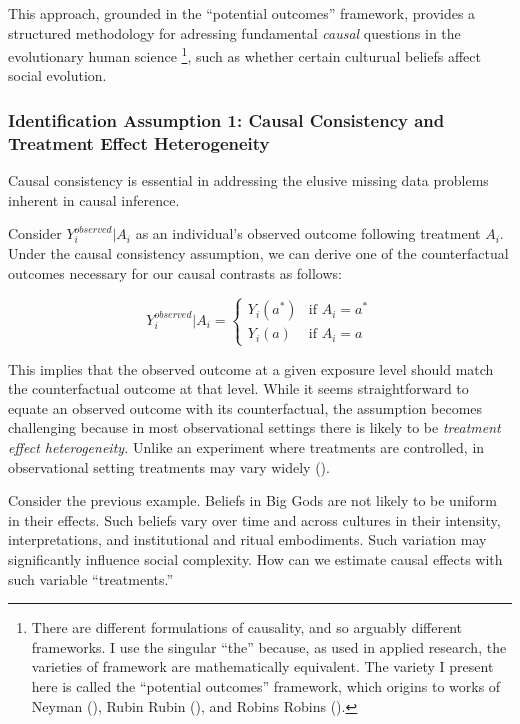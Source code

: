 \documentclass[
  singlecolumn,
  9pt]{article}
\begin{document}
This approach, grounded in the ``potential outcomes'' framework,
provides a structured methodology for adressing fundamental
\emph{causal} questions in the evolutionary human science \footnote{There
  are different formulations of causality, and so arguably different
  frameworks. I use the singular ``the'' because, as used in applied
  research, the varieties of framework are mathematically equivalent.
  The variety I present here is called the ``potential outcomes''
  framework, which origins to works of Neyman
  (), Rubin Rubin
  (), and Robins Robins
  ().}, such as whether certain culturual
beliefs affect social evolution.

\subsubsection{Identification Assumption 1: Causal Consistency and
Treatment Effect
Heterogeneity}\label{identification-assumption-1-causal-consistency-and-treatment-effect-heterogeneity}

Causal consistency is essential in addressing the elusive missing data
problems inherent in causal inference.

Consider \(Y_i^{observed}|A_i\) as an individual's observed outcome
following treatment \(A_i\). Under the causal consistency assumption, we
can derive one of the counterfactual outcomes necessary for our causal
contrasts as follows:

\[
Y_i^{observed}|A_i = 
\begin{cases} 
Y_i(a^*) & \text{if } A_i = a^* \\
Y_i(a) & \text{if } A_i = a
\end{cases}
\]

This implies that the observed outcome at a given exposure level should
match the counterfactual outcome at that level. While it seems
straightforward to equate an observed outcome with its counterfactual,
the assumption becomes challenging because in most observational
settings there is likely to be \emph{treatment effect heterogeneity.}
Unlike an experiment where treatments are controlled, in observational
setting treatments may vary widely
().

Consider the previous example. Beliefs in Big Gods are not likely to be
uniform in their effects. Such beliefs vary over time and across
cultures in their intensity, interpretations, and institutional and
ritual embodiments. Such variation may significantly influence social
complexity. How can we estimate causal effects with such variable
``treatments.''
\end{document}
